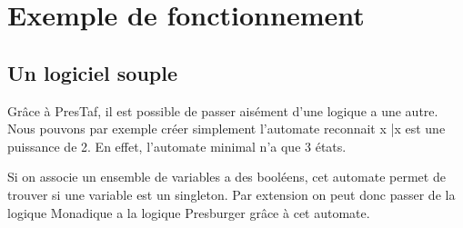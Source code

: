 \section{Exemple de fonctionnement}

\subsection{Un logiciel souple}

Grâce à PresTaf, il est possible de passer aisément d'une logique a une autre. Nous pouvons par exemple créer simplement l'automate reconnait {x |x est une puissance de 2}. En effet, l'automate minimal n'a que 3 états.


Si on associe un ensemble de variables a des booléens, cet automate permet de trouver si une variable est un singleton. Par extension on peut donc passer de la logique Monadique a la logique Presburger grâce à cet automate.
